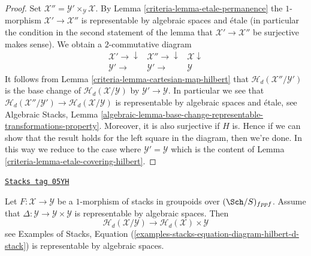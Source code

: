\begin{proof}

Set $\mathcal{X}'' = \mathcal{Y}' \times_\mathcal{Y} \mathcal{X}$. By
Lemma \ref{criteria-lemma-etale-permanence}
the $1$-morphism $\mathcal{X}' \to \mathcal{X}''$ is representable by
algebraic spaces and \'etale (in particular the condition in the second
statement of the lemma that $\mathcal{X}' \to \mathcal{X}''$ be surjective
makes sense). We obtain a $2$-commutative diagram
$$
\begin{array}{ccc}\mathcal{X}' \longrightarrow\downarrow & \mathcal{X}'' \longrightarrow\downarrow & \mathcal{X} \downarrow \\ \mathcal{Y}' \longrightarrow & \mathcal{Y}' \longrightarrow & \mathcal{Y}\end{array}
$$
It follows from
Lemma \ref{criteria-lemma-cartesian-map-hilbert}
that $\mathcal{H}_d(\mathcal{X}''/\mathcal{Y}')$ is the base change
of $\mathcal{H}_d(\mathcal{X}/\mathcal{Y})$ by $\mathcal{Y}' \to \mathcal{Y}$.
In particular we see that
$\mathcal{H}_d(\mathcal{X}''/\mathcal{Y}') \to
\mathcal{H}_d(\mathcal{X}/\mathcal{Y})$ is
representable by algebraic spaces and \'etale, see
Algebraic Stacks, Lemma
\ref{algebraic-lemma-base-change-representable-transformations-property}.
Moreover, it is also surjective if $H$ is.
 Hence if we can show that
the result holds for the left square in the diagram, then we're done.
In this way we reduce to the case where $\mathcal{Y}' = \mathcal{Y}$
which is the content of
Lemma \ref{criteria-lemma-etale-covering-hilbert}.
\end{proof}

\begin{lemma}
\label{criteria-lemma-relative-hilbert}
\href{https://stacks.math.columbia.edu/tag/05YH}{\texttt{Stacks tag 05YH}}

Let $F : \mathcal{X} \to \mathcal{Y}$ be a $1$-morphism of stacks in groupoids
over $(\Sch/S)_{fppf}$. Assume that
$\Delta : \mathcal{Y} \to \mathcal{Y} \times \mathcal{Y}$
is representable by algebraic spaces. Then
$$
\mathcal{H}_d(\mathcal{X}/\mathcal{Y})
\longrightarrow
\mathcal{H}_d(\mathcal{X}) \times \mathcal{Y}
$$
see
Examples of Stacks, Equation
(\ref{examples-stacks-equation-diagram-hilbert-d-stack})
is representable by algebraic spaces.
\end{lemma}

